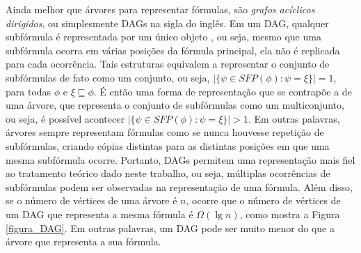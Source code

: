Ainda melhor que árvores para representar fórmulas, são \emph{grafos acíclicos dirigidos}, ou simplesmente DAGs na sigla do inglês. Em um DAG, qualquer subfórmula é representada por um único objeto \cite{jackson2004clause}, ou seja, mesmo que uma subfórmula ocorra em várias posições da fórmula principal, ela não é replicada para cada ocorrência. Tais estruturas equivalem a representar o conjunto de subfórmulas de fato como um conjunto, ou seja, $|\{\psi \in SFP(\phi) : \psi = \xi \}| = 1$, para todas $\phi$ e $\xi \sqsubseteq \phi$. É então uma forma de representação que se contrapõe a de uma árvore, que representa o conjunto de subfórmulas como um multiconjunto, ou seja, é possível acontecer $|\{\psi \in SFP(\phi) : \psi = \xi \}| > 1$. Em outras palavras, árvores sempre representam fórmulas como se nunca houvesse repetição de subfórmulas, criando cópias distintas para as distintas posições em que uma mesma subfórmula ocorre. Portanto, DAGs permitem uma representação mais fiel ao tratamento teórico dado neste trabalho, ou seja, múltiplas ocorrências de subfórmulas podem ser observadas na representação de uma fórmula. Além disso, se o número de vértices de uma árvore é $n$, ocorre que o número de vértices de um DAG que representa a mesma fórmula é $\Omega(\lg n)$, como mostra a Figura \ref{figura_DAG}. Em outras palavras, um DAG pode ser muito menor do que a árvore que representa a sua fórmula.

